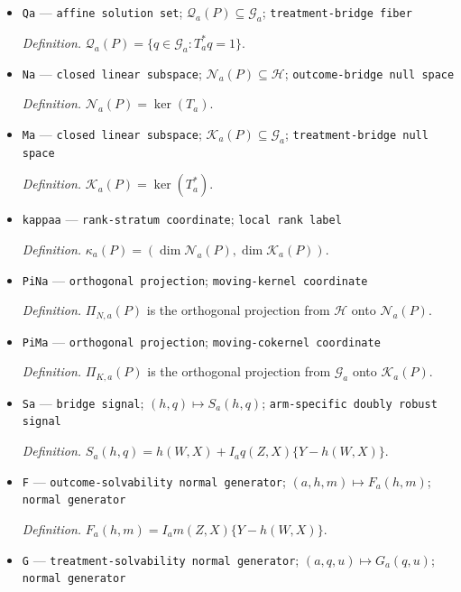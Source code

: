 \documentclass{article}
\begin{document}
\begin{itemize}
  \par\smallskip\noindent\emph{Definition.} \(\mathcal H_a(P)=\{h\in\mathcal H:T_a h=g_a\}\).
  \item \texttt{Qa} --- \texttt{affine solution set}; \(\mathcal Q_a(P)\subseteq\mathcal G_a\); \texttt{treatment-\allowbreak{}bridge fiber}
  \par\smallskip\noindent\emph{Definition.} \(\mathcal Q_a(P)=\{q\in\mathcal G_a:T_a^*q=1\}\).
  \item \texttt{Na} --- \texttt{closed linear subspace}; \(\mathcal N_a(P)\subseteq\mathcal H\); \texttt{outcome-\allowbreak{}bridge null space}
  \par\smallskip\noindent\emph{Definition.} \(\mathcal N_a(P)=\ker(T_a)\).
  \item \texttt{Ma} --- \texttt{closed linear subspace}; \(\mathcal K_a(P)\subseteq\mathcal G_a\); \texttt{treatment-\allowbreak{}bridge null space}
  \par\smallskip\noindent\emph{Definition.} \(\mathcal K_a(P)=\ker(T_a^*)\).
  \item \texttt{kappaa} --- \texttt{rank-\allowbreak{}stratum coordinate}; \texttt{local rank label}
  \par\smallskip\noindent\emph{Definition.} \(\kappa_a(P)=(\dim\mathcal N_a(P),\dim\mathcal K_a(P))\).
  \item \texttt{PiNa} --- \texttt{orthogonal projection}; \texttt{moving-\allowbreak{}kernel coordinate}
  \par\smallskip\noindent\emph{Definition.} \(\Pi_{N,a}(P)\) is the orthogonal projection from \(\mathcal H\) onto \(\mathcal N_a(P)\).
  \item \texttt{PiMa} --- \texttt{orthogonal projection}; \texttt{moving-\allowbreak{}cokernel coordinate}
  \par\smallskip\noindent\emph{Definition.} \(\Pi_{K,a}(P)\) is the orthogonal projection from \(\mathcal G_a\) onto \(\mathcal K_a(P)\).
  \item \texttt{Sa} --- \texttt{bridge signal}; \((h,q)\mapsto S_a(h,q)\); \texttt{arm-\allowbreak{}specific doubly robust signal}
  \par\smallskip\noindent\emph{Definition.} \(S_a(h,q)=h(W,X)+I_aq(Z,X)\{Y-h(W,X)\}\).
  \item \texttt{F} --- \texttt{outcome-\allowbreak{}solvability normal generator}; \((a,h,m)\mapsto F_a(h,m)\); \texttt{normal generator}
  \par\smallskip\noindent\emph{Definition.} \(F_a(h,m)=I_am(Z,X)\{Y-h(W,X)\}\).
  \item \texttt{G} --- \texttt{treatment-\allowbreak{}solvability normal generator}; \((a,q,u)\mapsto G_a(q,u)\); \texttt{normal generator}

\end{itemize}
\end{document}
